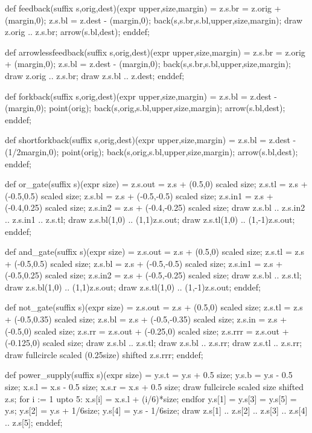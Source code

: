 def feedback(suffix s,orig,dest)(expr upper,size,margin) =
 z.s.br = z.orig + (margin,0); z.s.bl = z.dest - (margin,0);
 back(s,s.br,s.bl,upper,size,margin);
 draw z.orig .. z.s.br; arrow(s.bl,dest);
enddef;

def arrowlessfeedback(suffix s,orig,dest)(expr upper,size,margin) =
 z.s.br = z.orig + (margin,0); z.s.bl = z.dest - (margin,0);
 back(s,s.br,s.bl,upper,size,margin);
 draw z.orig .. z.s.br; draw z.s.bl .. z.dest;
enddef;

def forkback(suffix s,orig,dest)(expr upper,size,margin) =
 z.s.bl = z.dest - (margin,0); point(orig);
 back(s,orig,s.bl,upper,size,margin); arrow(s.bl,dest);
enddef;

def shortforkback(suffix s,orig,dest)(expr upper,size,margin) =
 z.s.bl = z.dest - (1/2margin,0); point(orig);
 back(s,orig,s.bl,upper,size,margin); arrow(s.bl,dest);
enddef;


def or_gate(suffix s)(expr size) =
 z.s.out = z.s + (0.5,0) scaled size;
 z.s.tl = z.s + (-0.5,0.5) scaled size;
 z.s.bl = z.s + (-0.5,-0.5) scaled size;
 z.s.in1 = z.s + (-0.4,0.25) scaled size;
 z.s.in2 = z.s + (-0.4,-0.25) scaled size;
 draw z.s.bl .. z.s.in2 .. z.s.in1 .. z.s.tl;
 draw z.s.bl{(1,0)} .. {(1,1)}z.s.out;
 draw z.s.tl{(1,0)} .. {(1,-1)}z.s.out;
enddef;

def and_gate(suffix s)(expr size)  =
 z.s.out = z.s + (0.5,0) scaled size;
 z.s.tl = z.s + (-0.5,0.5) scaled size;
 z.s.bl = z.s + (-0.5,-0.5) scaled size;
 z.s.in1 = z.s + (-0.5,0.25) scaled size;
 z.s.in2 = z.s + (-0.5,-0.25) scaled size;
 draw z.s.bl .. z.s.tl;
 draw z.s.bl{(1,0)} .. {(1,1)}z.s.out;
 draw z.s.tl{(1,0)} .. {(1,-1)}z.s.out;
enddef;

def not_gate(suffix s)(expr size) =
 z.s.out = z.s + (0.5,0) scaled size;
 z.s.tl = z.s + (-0.5,0.35) scaled size;
 z.s.bl = z.s + (-0.5,-0.35) scaled size;
 z.s.in = z.s + (-0.5,0) scaled size;
 z.s.rr = z.s.out + (-0.25,0) scaled size;
 z.s.rrr = z.s.out + (-0.125,0) scaled size;
 draw z.s.bl .. z.s.tl;
 draw z.s.bl .. z.s.rr;
 draw z.s.tl .. z.s.rr;
 draw fullcircle scaled (0.25size) shifted z.s.rrr;
enddef;

def power_supply(suffix s)(expr size) =
 y.s.t = y.s + 0.5 size; y.s.b = y.s - 0.5 size;
 x.s.l = x.s - 0.5 size; x.s.r = x.s + 0.5 size;
 draw fullcircle scaled size shifted z.s;
 for i := 1 upto 5: x.s[i] = x.s.l + (i/6)*size; endfor
 y.s[1] = y.s[3] = y.s[5] = y.s;
 y.s[2] = y.s + 1/6size; y.s[4] = y.s - 1/6size;
 draw z.s[1] .. z.s[2] .. z.s[3] .. z.s[4] .. z.s[5];
enddef;

